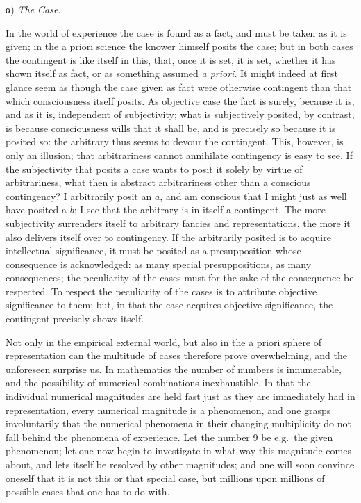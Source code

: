 \documentclass[12pt,a4paper,openany]{book}
\newcommand{\opage}[1]{\marginnote{\footnotesize\textit{[#1]}}}
\begin{document}
\begin{center}α) \emph{The Case}.\end{center}

In the world of experience the case is found as a fact,
and must be taken as it is given; in the a priori
science the knower himself posits the case; but in both
cases the contingent is like itself in this, that, once
it is set, it is set, whether it has shown itself
as fact, or as something assumed \textit{a priori}. It
might indeed at first glance seem as though the case given as fact were otherwise contingent than that which consciousness
itself posits. As objective case the fact is
\setcounter{footnote}{0}%
\opage{13}surely, because it is, and as it is, independent of
subjectivity; what is subjectively posited, by contrast, is because consciousness
wills that it shall be, and is precisely so because
it is posited so: the arbitrary thus seems to devour
the contingent. This, however, is only an illusion; that arbitrariness
cannot annihilate contingency is easy to
see. If the subjectivity that posits a case wants to posit
it solely by virtue of arbitrariness, what then is
abstract arbitrariness other than a conscious contingency?
I arbitrarily posit an $a$, and am conscious that I
might just as well have posited a $b$; I see that the arbitrary
is in itself a contingent. The more subjectivity
surrenders itself to arbitrary fancies and representations, the
more it also delivers itself over to contingency. If
the arbitrarily posited is to acquire intellectual significance, it must
be posited as a presupposition whose consequence is acknowledged:
as many special presuppositions, as many consequences;
the peculiarity of the cases must for the sake of the consequence be
respected. To respect the peculiarity of the cases is
to attribute objective significance to them; but, in that the case
acquires objective significance, the contingent precisely shows itself.

Not only in the empirical external world, but also in the
a priori sphere of representation can the multitude of cases
therefore prove overwhelming, and the unforeseen surprise us. In
mathematics the number of numbers is innumerable, and the possibility
of numerical combinations inexhaustible. In that the individual numerical magnitudes
are held fast just as they are immediately had in representation,
every numerical magnitude is a phenomenon, and one grasps involuntarily
that the numerical phenomena in their changing multiplicity
do not fall behind the phenomena of experience. Let the number $9$ be
e.g.\ the given phenomenon; let one now begin to investigate
in what way this magnitude comes about,
and lets itself be resolved by other magnitudes; and one will
soon convince oneself that it is not this or that
\setcounter{footnote}{0}%
\opage{14}special case, but millions upon millions of possible cases
that one has to do with.
\end{document}
